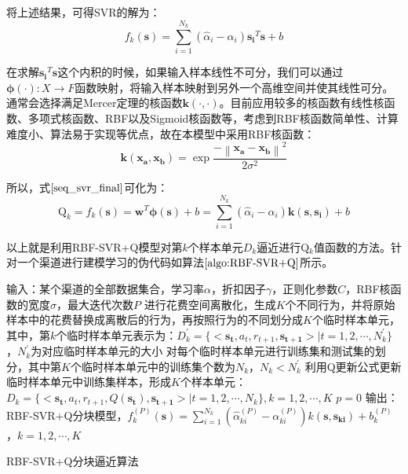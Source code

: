 将上述结果，可得SVR的解为：
\begin{equation}
\label{seq_svr_final}
f_{k}(\bm{s})=\sum_{i=1}^{N_{k}}(\hat{\alpha}_{i}-\alpha_{i})\bm{s_{i}}^{T}\bm{s}+b
\end{equation}

在求解$\bm{s_{i}}^{T}\bm{s}$这个内积的时候，如果输入样本线性不可分，我们可以通过$\bm{\phi(\cdot)}:X \to F$函数映射，将输入样本映射到另外一个高维空间并使其线性可分。通常会选择满足Mercer定理的核函数$\bm{k(\cdot,\cdot)}$。目前应用较多的核函数有线性核函数、多项式核函数、RBF以及Sigmoid核函数等，考虑到RBF核函数简单性、计算难度小、算法易于实现等优点，故在本模型中采用RBF核函数：
\begin{equation}
\bm{k(x_{a},x_{b})}=\exp{\frac{-\left \| \bm{x_{a}} - \bm{x_{b}} \right \|^{2}}{2\sigma^{2}}}
\end{equation}

所以，式$\eqref{seq_svr_final}$可化为：
\begin{equation}\label{seq_final}
\text{Q}_{k}=f_{k}(\bm{s})=\bm{w}^{T} \bm{\phi(s)} + b=\sum_{i=1}^{N_{k}}(\hat{\alpha}_{i}-\alpha_{i})\bm{k(s,s_{i})}+b
\end{equation}

以上就是利用RBF-SVR+Q模型对第$k$个样本单元$D_{k}$逼近进行Q$_{k}$值函数的方法。针对一个渠道进行建模学习的伪代码如算法$\ref{algo:RBF-SVR+Q}$所示。
\begin{algorithm}[htbp]
\small
\SetAlgoLined
{} 
输入：某个渠道的全部数据集合，学习率$\alpha$，折扣因子$\gamma$，正则化参数$C$，RBF核函数的宽度$\sigma$，最大迭代次数$P$\;
进行花费空间离散化，生成$K$个不同行为，并将原始样本中的花费替换成离散后的行为，再按照行为的不同划分成$K$个临时样本单元，其中，第$k$个临时样本单元表示为：$D_{k}^{'}=\{<\mathbf{s_{t}},a_{t},r_{t+1},\mathbf{s_{t+1}}>|t=1,2,\cdots,N_{k}^{'}\}$，$N_{k}^{'}$为对应临时样本单元的大小\;
对每个临时样本单元进行训练集和测试集的划分，其中第$K$个临时样本单元中的训练集个数为$N_{k}$，$N_{k}<N_{k}^{'}$\;
利用Q更新公式更新临时样本单元中训练集样本，形成$K$个样本单元：$D_{k}=\{<\mathbf{s_{t}},a_{t},r_{t+1},Q(\mathbf{s_{t}}),\mathbf{s_{t+1}}>|t=1,2,\cdots,N_{k}\}, k=1,2,\cdots,K$\;
$p=0$\;
输出：RBF-SVR+Q分块模型，$f_{k}^{(P)}(\bm{s})=\sum_{i=1}^{N_{k}}(\hat{\alpha}_{ki}^{(P)}-\alpha_{ki}^{(P)})k(\bm{s},\bm{s_{ki}})+b_{k}^{(P)}$，$k=1,2,\cdots,K$\;
\caption{RBF-SVR+Q分块逼近算法}
\label{algo:RBF-SVR+Q}
\end{algorithm}

